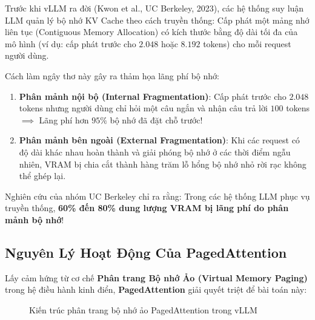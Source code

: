 Trước khi vLLM ra đời (Kwon et al., UC Berkeley, 2023), các hệ thống suy luận LLM quản lý bộ nhớ KV Cache theo cách truyền thống: Cấp phát một mảng nhớ liên tục (Contiguous Memory Allocation) có kích thước bằng độ dài tối đa của mô hình (ví dụ: cấp phát trước cho $2.048$ hoặc $8.192$ tokens) cho mỗi request người dùng.

Cách làm ngây thơ này gây ra thảm họa lãng phí bộ nhớ:
\begin{enumerate}
  \item \textbf{Phân mảnh nội bộ (Internal Fragmentation)}: Cấp phát trước cho $2.048$ tokens nhưng người dùng chỉ hỏi một câu ngắn và nhận câu trả lời $100$ tokens $\implies$ Lãng phí hơn $95\%$ bộ nhớ đã đặt chỗ trước!
  \item \textbf{Phân mảnh bên ngoài (External Fragmentation)}: Khi các request có độ dài khác nhau hoàn thành và giải phóng bộ nhớ ở các thời điểm ngẫu nhiên, VRAM bị chia cắt thành hàng trăm lỗ hổng bộ nhớ nhỏ rời rạc không thể ghép lại.
\end{enumerate}
Nghiên cứu của nhóm UC Berkeley chỉ ra rằng: Trong các hệ thống LLM phục vụ truyền thống, \textbf{60\% đến 80\% dung lượng VRAM bị lãng phí do phân mảnh bộ nhớ}!

\subsection{Nguyên Lý Hoạt Động Của PagedAttention}
Lấy cảm hứng từ cơ chế \textbf{Phân trang Bộ nhớ Ảo (Virtual Memory Paging)} trong hệ điều hành kinh điển, \textbf{PagedAttention} giải quyết triệt để bài toán này:

\begin{figure}[htbp]
\centering
{}
\caption{Kiến trúc phân trang bộ nhớ ảo PagedAttention trong vLLM}
\label{fig:pagedattention-architecture}
\end{figure}

